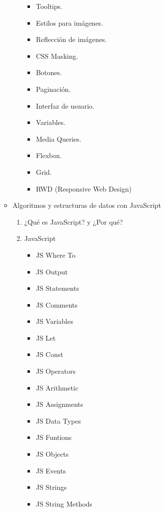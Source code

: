 \documentclass[12pt, letterpaper]{article}
\begin{document}
\begin{enumerate}
\begin{itemize}
\begin{enumerate}
\begin{itemize}
                \item Tooltips.
                \item Estilos para imágenes.
                \item Reflección de imágenes.
                \item CSS Masking.
                \item Botones.
                \item Paginación.
                \item Interfaz de usuario.
                \item Variables.
                \item Media Queries.
                \item Flexbox.
                \item Grid.
                \item RWD (Responsive Web Design)
            \end{itemize}
        \end{enumerate}
        \item Algoritmos y estructuras de datos con JavaScript
        \begin{enumerate}
            \item ¿Qué es JavaScript? y ¿Por qué?
            \item JavaScript
            \begin{itemize}
                \item JS Where To
                \item JS Output
                \item JS Statements
                \item JS Comments
                \item JS Variables
                \item JS Let
                \item JS Const
                \item JS Operators
                \item JS Arithmetic
                \item JS Assignments
                \item JS Data Types
                \item JS Funtions
                \item JS Objects
                \item JS Events
                \item JS Strings
                \item JS String Methods

\end{itemize}
\end{enumerate}
\end{itemize}
\end{enumerate}
\end{document}
